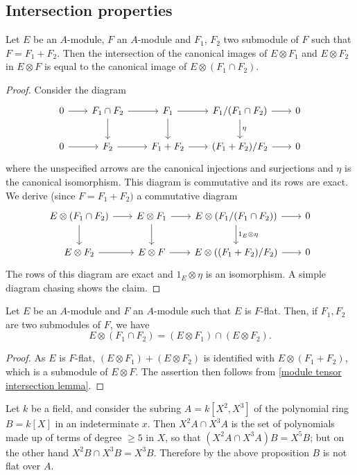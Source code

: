 \subsection{Intersection properties}
\begin{lemma}\label{module tensor intersection lemma}
Let $E$ be an $A$-module, $F$ an $A$-module and $F_1$, $F_2$ two submodule of $F$ such that $F=F_1+F_2$. Then the intersection of the canonical images of $E\otimes F_1$ and $E\otimes F_2$ in $E\otimes F$ is equal to the canonical image of $E\otimes(F_1\cap F_2)$.
\end{lemma}
\begin{proof}
Consider the diagram
\[\begin{tikzcd}[column sep=20pt,row sep=20pt]
0\ar[r]&F_1\cap F_2\ar[r]\ar[d]&F_1\ar[r]\ar[d]&F_1/(F_1\cap F_2)\ar[r]\ar[d,"\eta"]&0\\
0\ar[r]&F_2\ar[r]&F_1+F_2\ar[r]&(F_1+F_2)/F_2\ar[r]&0
\end{tikzcd}\]
where the unspecified arrows are the canonical injections and surjections and $\eta$ is the canonical isomorphism. This diagram is commutative and its rows are exact. We derive (since $F=F_1+F_2)$ a commutative diagram
\[\begin{tikzcd}[column sep=20pt,row sep=20pt]
E\otimes(F_1\cap F_2)\ar[r]\ar[d]&E\otimes F_1\ar[r]\ar[d]&E\otimes(F_1/(F_1\cap F_2))\ar[r]\ar[d,"1_E\otimes\eta"]&0\\
E\otimes F_2\ar[r]&E\otimes F\ar[r]&E\otimes((F_1+F_2)/F_2)\ar[r]&0
\end{tikzcd}\]
The rows of this diagram are exact and $1_E\otimes\eta$ is an isomorphism. A simple diagram chasing shows the claim.
\end{proof}
\begin{proposition}\label{module flat tensor intersection}
Let $E$ be an $A$-module and $F$ an $A$-module such that $E$ is $F$-flat. Then, if $F_1,F_2$ are two submodules of $F$, we have
\[E\otimes(F_1\cap F_2)=(E\otimes F_1)\cap(E\otimes F_2).\]
\end{proposition}
\begin{proof}
As $E$ is $F$-flat, $(E\otimes F_1)+(E\otimes F_2)$ is identified with $E\otimes(F_1+F_2)$, which is a submodule of $E\otimes F$. The assertion then follows from \cref{module tensor intersection lemma}.
\end{proof}
\begin{example}
Let $k$ be a field, and consider the subring $A=k[X^2,X^3]$ of the polynomial ring $B=k[X]$ in an indeterminate $x$. Then $X^2A\cap X^3A$ is the set of polynomials made up of terms of degree $\geq 5$ in $X$, so that $(X^2A\cap X^3A)B=X^5B$; but on the other hand $X^2B\cap X^3B=X^3B$. Therefore by the above proposition $B$ is not flat over $A$.
\end{example}
